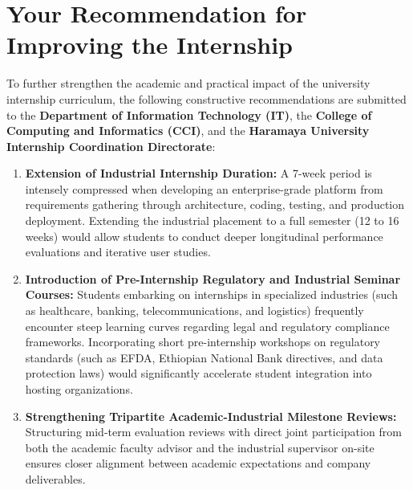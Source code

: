 \section{Your Recommendation for Improving the Internship}
To further strengthen the academic and practical impact of the university internship curriculum, the following constructive recommendations are submitted to the \textbf{Department of Information Technology (IT)}, the \textbf{College of Computing and Informatics (CCI)}, and the \textbf{Haramaya University Internship Coordination Directorate}:
\begin{enumerate}
    \item \textbf{Extension of Industrial Internship Duration:} A 7-week period is intensely compressed when developing an enterprise-grade platform from requirements gathering through architecture, coding, testing, and production deployment. Extending the industrial placement to a full semester (12 to 16 weeks) would allow students to conduct deeper longitudinal performance evaluations and iterative user studies.
    \item \textbf{Introduction of Pre-Internship Regulatory and Industrial Seminar Courses:} Students embarking on internships in specialized industries (such as healthcare, banking, telecommunications, and logistics) frequently encounter steep learning curves regarding legal and regulatory compliance frameworks. Incorporating short pre-internship workshops on regulatory standards (such as EFDA, Ethiopian National Bank directives, and data protection laws) would significantly accelerate student integration into hosting organizations.
    \item \textbf{Strengthening Tripartite Academic-Industrial Milestone Reviews:} Structuring mid-term evaluation reviews with direct joint participation from both the academic faculty advisor and the industrial supervisor on-site ensures closer alignment between academic expectations and company deliverables.
\end{enumerate}
